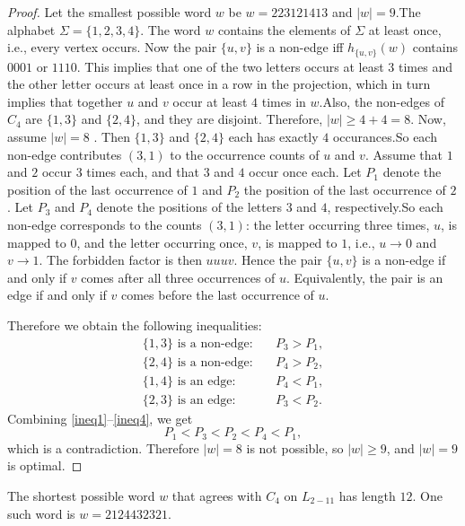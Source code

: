 \documentclass[runningheads]{llncs}
\begin{document}
\begin{proof}
Let the smallest possible word $w$ be $w = 223121413 $ and $|w| = 9$.The alphabet $\Sigma = \{1,2,3,4\}.$ The word $w$ contains the elements of $\Sigma$ at least once, i.e., every vertex occurs. Now the pair $\{u,v\}$ is a non-edge iff $h_{\{u,v\}}(w)$ contains $0001$ or $1110$. This implies that one of the two letters occurs at least $3$ times and the other letter occurs at least once  in a row in the projection, which in turn implies that together $u$ and $v$ occur  at least $4$ times in $w$.Also, the non-edges of $C_4$ are $\{1,3\}$ and $\{2,4\}$, and they are disjoint.  Therefore, $|w| \geq 4+4 = 8$.
Now, assume  $|w| = 8$ .
Then $\{1,3\}$ and $\{2,4\}$ each has exactly $4$ occurances.So each non-edge contributes $(3,1)$ to the occurrence counts of $u$ and $v$. Assume that $1$ and $2$ occur $3$ times each, and that $3$ and $4$ occur once each. Let $P_1$ denote the position of the last occurrence of $1$ and $P_2$ the position of the last occurrence of $2$. Let $P_3$ and $P_4$ denote the positions of the letters $3$ and $4$, respectively.So each non-edge corresponds to the counts $(3,1)$: the letter occurring three times, $u$, is mapped to $0$, and the letter occurring once, $v$, is mapped to $1$, i.e., $u \to 0$ and $v \to 1$. The forbidden factor is then $uuuv$. Hence the pair $\{u,v\}$ is a non-edge if and only if $v$ comes after all three occurrences of $u$. Equivalently, the pair is an edge if and only if $v$ comes before the last occurrence of $u$.

Therefore we obtain the following inequalities:
\begin{align}
\{1,3\} \text{ is a non-edge:} \quad & P_3 > P_1, \label{ineq1}\\
\{2,4\} \text{ is a non-edge:} \quad & P_4 > P_2, \label{ineq2}\\
\{1,4\} \text{ is an edge:} \quad & P_4 < P_1, \label{ineq3}\\
\{2,3\} \text{ is an edge:} \quad & P_3 < P_2. \label{ineq4}
\end{align}
Combining \eqref{ineq1}--\eqref{ineq4}, we get
\[
P_1 < P_3 < P_2 < P_4 < P_1,
\]
which is a contradiction. Therefore $|w| = 8$ is not possible, so $|w| \geq 9$, and $|w| = 9$ is optimal.
\end{proof}

\begin{proposition}
The shortest possible word $w$ that agrees with $C_4$ on $L_{2-11}$ has length $12$. One such word is $w = 2124432321$.
\end{proposition}
\end{document}
